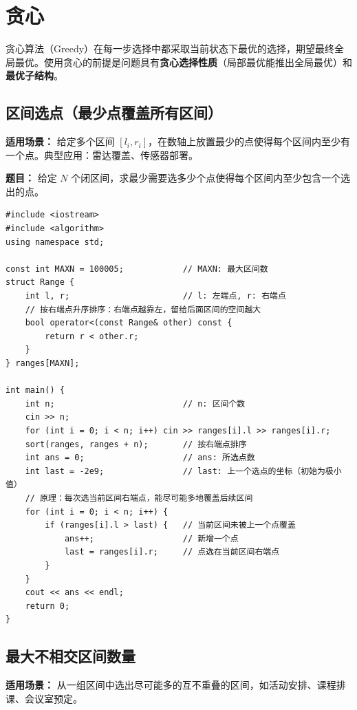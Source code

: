 \documentclass[12pt,a4paper]{ctexart}
\begin{document}
\newpage

\section{贪心}
贪心算法（Greedy）在每一步选择中都采取当前状态下最优的选择，期望最终全局最优。使用贪心的前提是问题具有\textbf{贪心选择性质}（局部最优能推出全局最优）和\textbf{最优子结构}。

\subsection{区间选点（最少点覆盖所有区间）}
\textbf{适用场景：} 给定多个区间 $[l_i, r_i]$，在数轴上放置最少的点使得每个区间内至少有一个点。典型应用：雷达覆盖、传感器部署。

\textbf{题目：} 给定 $N$ 个闭区间，求最少需要选多少个点使得每个区间内至少包含一个选出的点。

\begin{lstlisting}[caption={贪心——按右端点排序，每次选右端点}]
#include <iostream>
#include <algorithm>
using namespace std;

const int MAXN = 100005;            // MAXN: 最大区间数
struct Range {
    int l, r;                       // l: 左端点, r: 右端点
    // 按右端点升序排序：右端点越靠左，留给后面区间的空间越大
    bool operator<(const Range& other) const {
        return r < other.r;
    }
} ranges[MAXN];

int main() {
    int n;                          // n: 区间个数
    cin >> n;
    for (int i = 0; i < n; i++) cin >> ranges[i].l >> ranges[i].r;
    sort(ranges, ranges + n);       // 按右端点排序
    int ans = 0;                    // ans: 所选点数
    int last = -2e9;                // last: 上一个选点的坐标（初始为极小值）
    // 原理：每次选当前区间右端点，能尽可能多地覆盖后续区间
    for (int i = 0; i < n; i++) {
        if (ranges[i].l > last) {   // 当前区间未被上一个点覆盖
            ans++;                  // 新增一个点
            last = ranges[i].r;     // 点选在当前区间右端点
        }
    }
    cout << ans << endl;
    return 0;
}
\end{lstlisting}

\subsection{最大不相交区间数量}
\textbf{适用场景：} 从一组区间中选出尽可能多的互不重叠的区间，如活动安排、课程排课、会议室预定。
\end{document}
